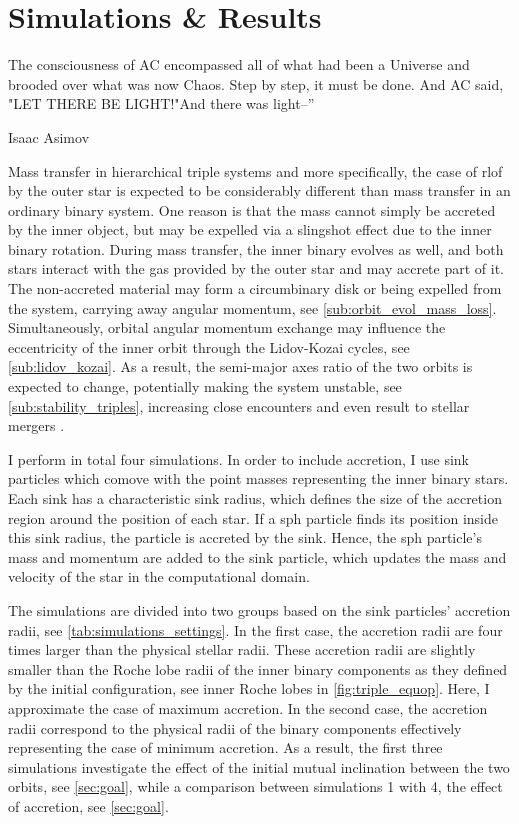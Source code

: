 \chapter{Simulations \& Results}\label{simulations}

\epigraph{The consciousness of AC encompassed all of what had been a Universe and brooded over what was now Chaos. Step by step, it must be done. And AC said, "LET THERE BE LIGHT!"And there was light--”}{Isaac Asimov}


Mass transfer in hierarchical triple
systems and more specifically, the case of \ac{rlof} by the outer star is expected to be considerably different than mass transfer in an ordinary binary system. One reason is that the mass cannot simply be accreted by the inner
object, but may be expelled via a slingshot effect due to the inner binary rotation. During mass transfer, the inner binary evolves as well, and both stars interact with the gas provided by the outer star and may accrete part of it. The non-accreted material may form a circumbinary disk or being expelled from the system, carrying away angular momentum, see \cref{sub:orbit_evol_mass_loss}. Simultaneously, orbital angular momentum exchange may influence the eccentricity of the inner orbit through the Lidov-Kozai cycles, see \cref{sub:lidov_kozai}. As a result, the semi-major axes ratio of the two orbits is expected to change, potentially making the system unstable, see \cref{sub:stability_triples}, increasing close encounters and even result to stellar mergers \citep{antonini2017binary,silsbee2017lidov,vigna2021massive}.

I perform in total four simulations. In order to include accretion, I use sink particles which comove with the point masses representing the inner binary stars. Each sink has a characteristic sink radius, which defines the size of the accretion region around the position of each star. If a \ac{sph} particle finds its position inside this sink radius, the particle is accreted by the sink. Hence, the \ac{sph} particle's mass and momentum are added to the sink particle, which updates the mass and velocity of the star in the computational domain.

The simulations are divided into two groups based on the sink particles' accretion radii, see \cref{tab:simulations_settings}. In the first case, the accretion radii are four times larger than the physical stellar radii. These accretion radii are slightly smaller than the Roche lobe radii of the inner binary components as they defined by the initial configuration, see inner Roche lobes in \cref{fig:triple_equop}. Here, I approximate the case of maximum accretion. In the second case, the accretion radii correspond to the physical radii of the binary components effectively representing the case of minimum accretion. As a result, the first three simulations investigate the effect of the initial mutual inclination between the two orbits, see \cref{sec:goal}, while a comparison between simulations 1 with 4, the effect of accretion, see \cref{sec:goal}. 

